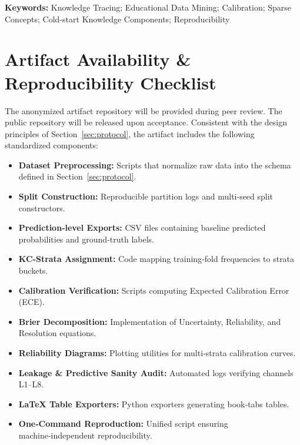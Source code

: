 \documentclass[12pt,a4paper]{jedm}
\begin{document}
\vspace{10pt}
\noindent\textbf{Keywords:} Knowledge Tracing; Educational Data Mining; Calibration; Sparse Concepts; Cold-start Knowledge Components; Reproducibility








\section*{Artifact Availability \& Reproducibility Checklist}
The anonymized artifact repository will be provided during peer review. The public repository will be released upon acceptance. Consistent with the design principles of Section~\ref{sec:protocol}, the artifact includes the following standardized components:
\begin{itemize}
  \item \textbf{Dataset Preprocessing:} Scripts that normalize raw data into the schema defined in Section~\ref{sec:protocol}.
  \item \textbf{Split Construction:} Reproducible partition logs and multi‑seed split constructors.
  \item \textbf{Prediction‑level Exports:} CSV files containing baseline predicted probabilities and ground‑truth labels.
  \item \textbf{KC‑Strata Assignment:} Code mapping training‑fold frequencies to strata buckets.
  \item \textbf{Calibration Verification:} Scripts computing Expected Calibration Error (ECE).
  \item \textbf{Brier Decomposition:} Implementation of Uncertainty, Reliability, and Resolution equations.
  \item \textbf{Reliability Diagrams:} Plotting utilities for multi‑strata calibration curves.
  \item \textbf{Leakage \& Predictive Sanity Audit:} Automated logs verifying channels L1--L8.
  \item \textbf{LaTeX Table Exporters:} Python exporters generating book‑tabs tables.
  \item \textbf{One‑Command Reproduction:} Unified script ensuring machine‑independent reproducibility.
\end{itemize}

\appendix

\end{document}
